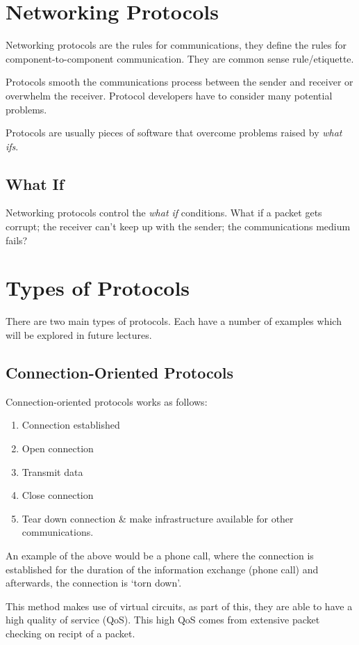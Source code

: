 
\section*{Networking Protocols}
Networking protocols are the rules for communications, they define the rules for component-to-component communication. They are common sense rule/etiquette. 

Protocols smooth the communications process between the sender and receiver or overwhelm the receiver. Protocol developers have to consider many potential problems.

Protocols are usually pieces of software that overcome problems raised by \textit{what ifs}.
\subsection*{What If}
Networking protocols control the \textit{what if} conditions. What if a packet gets corrupt; the receiver can't keep up with the sender; the communications medium fails? 

\section*{Types of Protocols}
There are two main types of protocols. Each have a number of examples which will be explored in future lectures.
\subsection*{Connection-Oriented Protocols}
Connection-oriented protocols works as follows:
\begin{enumerate}
    \item Connection established
    \item Open connection
    \item Transmit data
    \item Close connection
    \item Tear down connection \& make infrastructure available for other communications.
\end{enumerate}
An example of the above would be a phone call, where the connection is established for the duration of the information exchange (phone call) and afterwards, the connection is `torn down'.

This method makes use of virtual circuits, as part of this, they are able to have a high quality of service (QoS). This high QoS comes from extensive packet checking on recipt of a packet.

